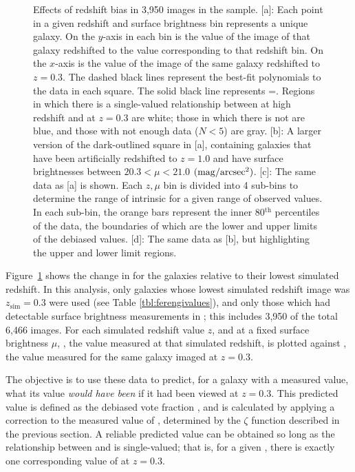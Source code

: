 \documentclass[twocolumn]{aastex6}
\begin{document}
\begin{figure}
\caption{Effects of redshift bias in 3,950 images in the \ferengi{} sample. [a]: Each point in a given redshift and surface brightness bin represents a unique galaxy. On the $y$-axis in each bin is the \pfeatures{} value of the image of that galaxy redshifted to the value corresponding to that redshift bin. On the $x$-axis is the \pfeatures{} value of the image of the same galaxy redshifted to $z=0.3$. The dashed black lines represent the best-fit polynomials to the data in each square. The solid black line represents \pfeaturesz=\pfeaturesrest. Regions in which there is a single-valued relationship between \pfeatures{} at high redshift and at $z=0.3$ are white; those in which there is not are blue, and those with not enough data ($N<5$) are gray. [b]: A larger version of the dark-outlined square in [a], containing \ferengi{} galaxies that have been artificially redshifted to $z=1.0$ and have surface brightnesses between $20.3 < \mu < 21.0$ $\rm (mag/arcsec^2)$. [c]: The same data as [a] is shown. Each $z,\mu$ bin is divided into 4 sub-bins to determine the range of intrinsic \pfeaturesrest{} for a given range of observed \pfeaturesz{} values. In each sub-bin, the orange bars represent the inner 80$^\mathrm{th}$ percentiles of the data, the boundaries of which are the lower and upper limits of the debiased values. [d]: The same data as [b], but highlighting the upper and lower limit regions.}
\label{fig:p_vs_p}
\end{figure}

Figure~\ref{fig:p_vs_p} shows the change in \pfeatures{} for the \ferengi{} galaxies relative to their lowest simulated redshift. In this analysis, only galaxies whose lowest simulated redshift image was $z_\mathrm{sim}=0.3$ were used (see Table \ref{tbl:ferengivalues}), and only those which had detectable surface brightness measurements in \sextractor; this includes 3,950 of the total 6,466 images. For each simulated redshift value $z$, and at a fixed surface brightness $\mu$, \pfeaturesz, the value measured at that simulated redshift, is plotted against \pfeaturesrest, the value measured for the same galaxy imaged at $z=0.3$. 
 
The objective is to use these data to predict, for a galaxy with a measured \pfeaturesz{} value, what its \pfeatures{} value \emph{would have been} if it had been viewed at $z=0.3$. This predicted value is defined as the debiased vote fraction \pfeaturesdebiased, and is calculated by applying a correction to the measured value of \pfeatures, determined by the $\zeta$ function described in the previous section. A reliable predicted value can be obtained so long as the relationship between \pfeaturesz{} and \pfeaturesrest{} is single-valued; that is, for a given \pfeaturesz, there is exactly one corresponding value of \pfeatures{} at $z=0.3$. 
\end{document}
